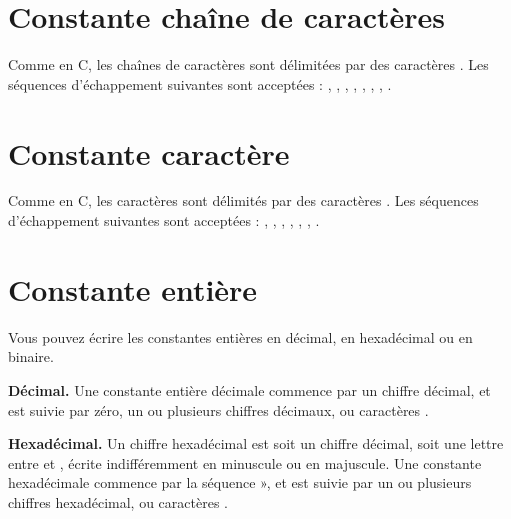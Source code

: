 \section{Constante chaîne de caractères}

Comme en C, les chaînes de caractères sont délimitées par des caractères . Les séquences d’échappement suivantes sont acceptées : \piccolo{\\f}, \piccolo{\\n}, \piccolo{\\r}, \piccolo{\\v}, \piccolo{\\\\}, , , .

\section{Constante caractère}

Comme en C, les caractères sont délimités par des caractères .  Les séquences d’échappement suivantes sont acceptées : \piccolo{\\f}, \piccolo{\\n}, \piccolo{\\r}, \piccolo{\\v}, \piccolo{\\\\}, , .

\section{Constante entière}

Vous pouvez écrire les constantes entières en décimal, en hexadécimal ou en binaire. 

\textbf{Décimal.} Une constante entière décimale commence par un chiffre décimal, et est suivie par zéro, un ou plusieurs chiffres décimaux, ou caractères \piccolo{\_}.

\textbf{Hexadécimal.} Un chiffre hexadécimal est soit un chiffre décimal, soit une lettre entre  et , écrite indifféremment en minuscule ou en majuscule. Une constante hexadécimale commence par la séquence  », et est suivie par un ou plusieurs chiffres hexadécimal, ou caractères \piccolo{\_}.

